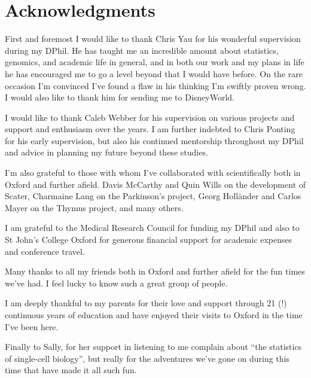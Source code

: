
%
%

\bigskip

\begingroup
\let\clearpage\relax
\let\cleardoublepage\relax
\let\cleardoublepage\relax
\chapter*{Acknowledgments}
First and foremost I would like to thank Chris Yau for his wonderful supervision during my DPhil. 
He has taught me an incredible amount about statistics, genomics, and academic life in general, and in both our work and my plans in life he has encouraged me to go a level beyond that I would have before. On the rare occasion I'm convinced I've found a flaw in his thinking I'm swiftly proven wrong. I would also like to thank him for sending me to DisneyWorld.

I would like to thank Caleb Webber for his supervision on various projects and support and enthusiasm over the years. I am further indebted to Chris Ponting for his early supervision, but also his continued mentorship throughout my DPhil and advice in planning my future beyond these studies.

I'm also grateful to those with whom I've collaborated with scientifically both in Oxford and further afield. Davis McCarthy and Quin Wills on the development of Scater, Charmaine Lang on the Parkinson's project, Georg Holl{\"a}nder and Carlos Mayer on the Thymus project, and many others.

I am grateful to the Medical Research Council for funding my DPhil and also to St John's College Oxford for generous financial support for academic expenses and conference travel.

Many thanks to all my friends both in Oxford and further afield for the fun times we've had. I feel lucky to know such a great group of people.

I am deeply thankful to my parents for their love and support through 21 (!) continuous years of education and have enjoyed their visits to Oxford in the time I've been here.

Finally to Sally, for her support in listening to me complain about ``the statistics of single-cell biology'',
but really for the adventures we've gone on during this time that have made it all such fun.


\endgroup
